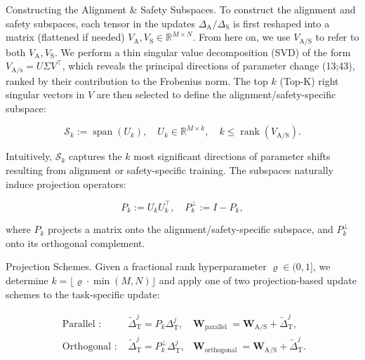 \documentclass[10pt]{article}
\begin{document}
Constructing the Alignment \& Safety Subspaces. To construct the alignment and safety subspaces, each tensor in the updates $\Delta_{\mathrm{A}} / \Delta_{\mathrm{S}}$ is first reshaped into a matrix (flattened if needed) $V_{\mathrm{A}}, V_{\mathrm{S}} \in \mathbb{R}^{M \times N}$. From here on, we use $V_{\mathrm{A} / \mathrm{S}}$ to refer to both $V_{\mathrm{A}}, V_{\mathrm{S}}$. We perform a thin singular value decomposition (SVD) of the form $V_{\mathrm{A} / \mathrm{s}}=U \Sigma V^{\top}$, which reveals the principal directions of parameter change (13;43), ranked by their contribution to the Frobenius norm. The top $k$ (Top-K) right singular vectors in $V$ are then selected to define the alignment/safety-specific subspace:


\begin{equation*}
\mathcal{S}_{k}:=\operatorname{span}\left(U_{k}\right), \quad U_{k} \in \mathbb{R}^{M \times k}, \quad k \leq \operatorname{rank}\left(V_{\mathrm{A} / \mathrm{S}}\right) . \tag{3}
\end{equation*}


Intuitively, $\mathcal{S}_{k}$ captures the $k$ most significant directions of parameter shifts resulting from alignment or safety-specific training. The subspaces naturally induce projection operators:


\begin{equation*}
P_{k}:=U_{k} U_{k}^{\top}, \quad P_{k}^{\perp}:=I-P_{k}, \tag{4}
\end{equation*}


where $P_{k}$ projects a matrix onto the alignment/safety-specific subspace, and $P_{k}^{\perp}$ onto its orthogonal complement.

Projection Schemes. Given a fractional rank hyperparameter $\varrho \in(0,1]$, we determine $k= \lfloor\varrho \cdot \min (M, N)\rfloor$ and apply one of two projection-based update schemes to the task-specific update:

\[
\begin{array}{rlr}
\text { Parallel : } & \tilde{\Delta}_{\mathrm{T}}^{j}=P_{k} \Delta_{\mathrm{T}}^{j}, & \mathbf{W}_{\text {parallel }}=\mathbf{W}_{\mathrm{A} / \mathrm{S}}+\tilde{\Delta}_{\mathrm{T}}^{j}, \\
\text { Orthogonal : } & \tilde{\Delta}_{\mathrm{T}}^{j}=P_{k}^{\perp} \Delta_{\mathrm{T}}^{j}, & \mathbf{W}_{\text {orthogonal }}=\mathbf{W}_{\mathrm{A} / \mathrm{S}}+\tilde{\Delta}_{\mathrm{T}}^{j} . \tag{6}
\end{array}
\]
\end{document}
